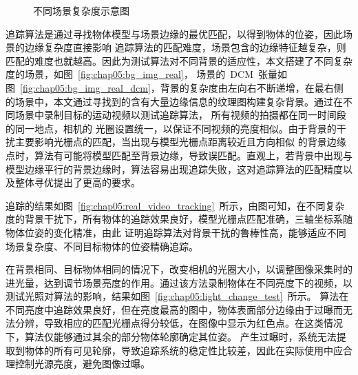 \begin{figure}[t] %
    \centering%
      \vskip0.3cm
    \caption{不同场景复杂度示意图}
    \label{fig:chap05:diff_bg_img}
    \end{figure}

追踪算法是通过寻找物体模型与场景边缘的最优匹配，以得到物体的位姿，因此场景的边缘复杂度直接影响
追踪算法的匹配难度，场景包含的边缘特征越复杂，则匹配的难度也就越高。因此为测试算法对不同背景的适应性，本文搭建了不同复杂度的场景，如图~\ref{fig:chap05:bg_img_real}，
场景的~DCM~张量如图~\ref{fig:chap05:bg_img_real_dcm}，背景的复杂度由左向右不断递增，在最右侧的场景中，本文通过寻找到的含有大量边缘信息的纹理图构建复杂背景。通过在不同场景中录制目标的运动视频以测试追踪算法，
所有视频的拍摄都在同一时间段的同一地点，相机的
光圈设置统一，以保证不同视频的亮度相似。由于背景的干扰主要影响光栅点的匹配，当出现与模型光栅点距离较近且方向相似
的背景边缘点时，算法有可能将模型匹配至背景边缘，导致误匹配。直观上，若背景中出现与模型边缘平行的背景边缘时，算法容易出现追踪失败，这对追踪算法的匹配精度以及整体寻优提出了更高的要求。

追踪的结果如图~\ref{fig:chap05:real_video_tracking}~所示，由图可知，在不同复杂度的背景干扰下，所有物体的追踪效果良好，模型光栅点匹配准确，三轴坐标系随物体位姿的变化精准，由此
证明追踪算法对背景干扰的鲁棒性高，能够适应不同场景复杂度、不同目标物体的位姿精确追踪。


在背景相同、目标物体相同的情况下，改变相机的光圈大小，以调整图像采集时的进光量，达到调节场景亮度的作用。通过该方法录制物体在不同亮度下的视频，以测试光照对算法的影响，结果如图~\ref{fig:chap05:light_change_test}~所示。
算法在不同亮度中追踪效果良好，但在亮度最高的图中，物体表面部分边缘由于过曝而无法分辨，导致相应的匹配光栅点得分较低，在图像中显示为红色点。在这类情况下，算法仅能够通过其余的部分物体轮廓确定其位姿。
产生过曝时，系统无法提取到物体的所有可见轮廓，导致追踪系统的稳定性比较差，因此在实际使用中应合理控制光源亮度，避免图像过曝。


